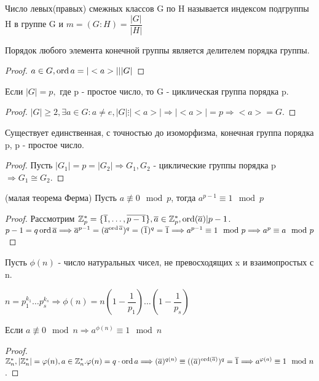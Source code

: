 \begin{definition}
	Число левых(правых) смежных классов G по H называется индексом подгруппы H в группе G и \(m = (G : H) = \dfrac{|G|}{|H|}\)
\end{definition}
\begin{corollary}
	Порядок любого элемента конечной группы является делителем порядка группы.
\end{corollary}
\begin{proof}
	\(a\in G, \operatorname{ord} a = |<a>|| |G| \)
\end{proof}
\begin{corollary}
	Если \(|G| = p,\) где p - простое число, то G - циклическая группа порядка p.
\end{corollary}
\begin{proof}
	\(|G|\ge 2, \exists a\in G: a\ne e, |G| \vdots |<a>| \Longrightarrow |<a>| = p \Longrightarrow <a> = G\).
\end{proof}
\begin{corollary}
	Существует единственная, с точностью до изоморфизма, конечная группа порядка p, p - простое число.
\end{corollary}
\begin{proof}
	Пусть \(|G_1| = p = |G_2| \Longrightarrow G_1, G_2\) - циклические группы порядка p \(\Longrightarrow G_1\cong G_2\).
\end{proof}
\begin{corollary}
	(малая теорема Ферма) \newline
	Пусть \(a\not\equiv 0\mod p\), тогда \(a^{p-1}\equiv 1 \mod p\)
\end{corollary}
\begin{proof}
	Рассмотрим \(\mathbb{Z}^*_p = \{\overline 1, \ldots, \overline {p-1}\}, \overline a \in \mathbb{Z}_p^*, \operatorname{ord}(\overline a)|p-1\). \(p-1 = q\operatorname{ord} \overline a \Longrightarrow \overline{a}^{p-1} = (\overline{a}^{\operatorname{ord} \overline{a}})^q = (\overline 1)^q = \overline 1 \Longrightarrow a^{p-1} \equiv 1 \mod p \Longrightarrow a^p \equiv a \mod p\)
\end{proof}
\begin{definition}
	Пусть \(\phi(n)\) - число натуральных чисел, не превосходящих x и взаимопростых с n.
\end{definition}
\begin{proposition}
	\(n = p_1^{k_1}\ldots p_s^{k_s} \Longrightarrow \phi(n) = n(1-\dfrac{1}{p_1})\ldots(1-\dfrac{1}{p_s})\)
\end{proposition}
\begin{corollary}
	Если \(a\not\equiv 0 \mod n\Longrightarrow a^{\phi(n)}\equiv 1 \mod n\)
\end{corollary}
\begin{proof}
	\(\mathbb{Z}_n^*, |\mathbb{Z}_n^*| = \varphi(n), a\in \mathbb{Z}_n^*. \varphi(n) = q\cdot\operatorname{ord} a \Longrightarrow (\overline a)^{q(n)}\equiv ((\overline{a})^{\operatorname{ord}(\overline a)})^q = \overline 1 \Longrightarrow a^{\varphi(a)}\equiv 1 \mod n\).
\end{proof}


